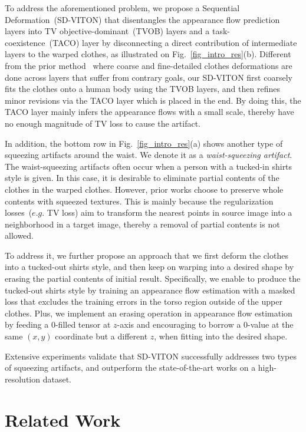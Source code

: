 \documentclass[letterpaper]{article} %
\begin{document}
To address the aforementioned problem, we propose a Sequential Deformation~(SD-VITON) that disentangles the appearance flow prediction layers into TV objective-dominant~(TVOB) layers and a task-coexistence~(TACO) layer by disconnecting a direct contribution of intermediate layers to the warped clothes, as illustrated on Fig.~\ref{fig_intro_res}(b).
Different from the prior method~\cite{lee2022hrviton} where coarse and fine-detailed clothes deformations are done across layers that suffer from contrary goals, our SD-VITON first coarsely fits the clothes onto a human body using the TVOB layers, and then refines minor revisions via the TACO layer which is placed in the end.
By doing this, the TACO layer mainly infers the appearance flows with a small scale, thereby have no enough magnitude of TV loss to cause the artifact.

In addition, the bottom row in Fig.~\ref{fig_intro_res}(a) shows another type of squeezing artifacts around the waist.
We denote it as a \textit{waist-squeezing artifact}.
The waist-squeezing artifacts often occur when a person with a tucked-in shirts style is given.
In this case, it is desirable to eliminate partial contents of the clothes in the warped clothes.
However, prior works choose to preserve whole contents with squeezed textures.
This is mainly because the regularization losses~($e.g.$ TV loss) aim to transform the nearest points in source image into a neighborhood in a target image, thereby a removal of partial contents is not allowed.

To address it, we further propose an approach that we first deform the clothes into a tucked-out shirts style, and then keep on warping into a desired shape by erasing the partial contents of initial result.
Specifically, we enable to produce the tucked-out shirts style by training an appearance flow estimation with a masked loss that excludes the training errors in the torso region outside of the upper clothes.
Plus, we implement an erasing operation in appearance flow estimation by feeding a 0-filled tensor at $z$-axis and encouraging to borrow a 0-value at the same $(x,y)$ coordinate but a different $z$, when fitting into the desired shape.

Extensive experiments validate that SD-VITON successfully addresses two types of squeezing artifacts, and outperform the state-of-the-art works on a high-resolution dataset.


\section{Related Work}
\label{sec_related_work}
\end{document}
